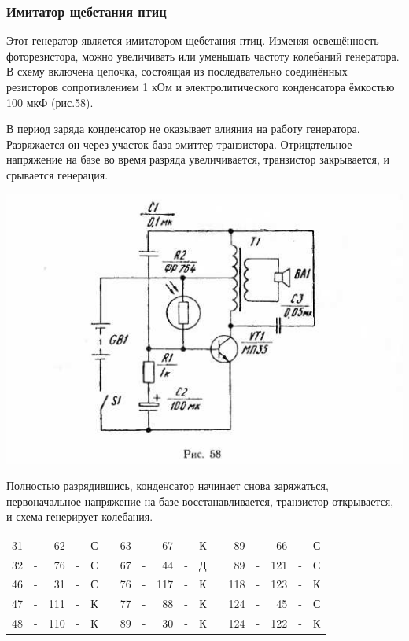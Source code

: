 \documentclass[12pt]{article}
\begin{document}
\hrulefill

\subsubsection{ Имитатор щебетания птиц }
Этот генератор является имитатором щебетания птиц. Изменяя освещённость фоторезистора, можно увеличивать или уменьшать частоту колебаний генератора. В схему включена цепочка, состоящая из последвательно соединённых резисторов сопротивлением 1 кОм и электролитического конденсатора ёмкостью 100 мкФ (рис.58).

В период заряда конденсатор не оказывает влияния на работу генератора. Разряжается он через участок база-эмиттер транзистора. Отрицательное напряжение на базе во время разряда увеличивается, транзистор закрывается, и срывается генерация.

\includegraphics[scale=0.9, angle=0]{ekon3_058_1}

\newpage

Полностью разрядившись, конденсатор начинает снова заряжаться, первоначальное напряжение на базе восстанавливается, транзистор открывается, и схема генерирует колебания.

\hrulefill

\begin{tabular}{r c r c r p{2cm} r c r c r p{2cm} r c r c r}
 31 & - &  62 & - & С &     &  63 & - &  67 & - & К &    &  89 & - &  66 & - & С\\
 32 & - &  76 & - & С &     &  67 & - &  44 & - & Д &    &  89 & - & 121 & - & С\\
 46 & - &  31 & - & С &     &  76 & - & 117 & - & К &    & 118 & - & 123 & - & К\\
 47 & - & 111 & - & К &     &  77 & - &  88 & - & К &    & 124 & - &  45 & - & С\\
 48 & - & 110 & - & К &     &  89 & - &  30 & - & К &    & 124 & - & 122 & - & К\\
\end{tabular}
\end{document}
